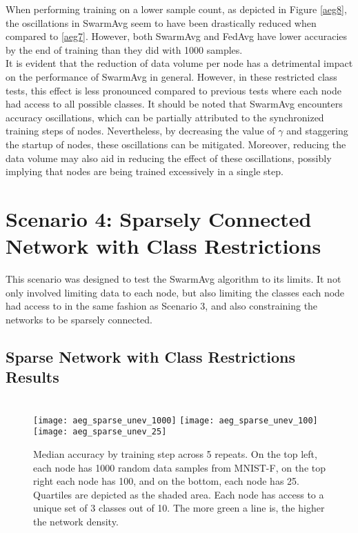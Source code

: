 When performing training on a lower sample count, as depicted in Figure \ref{aeg8}, the oscillations in SwarmAvg seem to have been drastically reduced when compared to \ref{aeg7}. However, both SwarmAvg and FedAvg have lower accuracies by the end of training than they did with 1000 samples. \\

It is evident that the reduction of data volume per node has a detrimental impact on the performance of SwarmAvg in general. However, in these restricted class tests, this effect is less pronounced compared to previous tests where each node had access to all possible classes. It should be noted that SwarmAvg encounters accuracy oscillations, which can be partially attributed to the synchronized training steps of nodes. Nevertheless, by decreasing the value of $\gamma$ and staggering the startup of nodes, these oscillations can be mitigated. Moreover, reducing the data volume may also aid in reducing the effect of these oscillations, possibly implying that nodes are being trained excessively in a single step.

\section{Scenario 4: Sparsely Connected Network with Class Restrictions}
This scenario was designed to test the SwarmAvg algorithm to its limits. It not only involved limiting data to each node, but also limiting the classes each node had access to in the same fashion as Scenario 3, and also constraining the networks to be sparsely connected.

\subsection{Sparse Network with Class Restrictions Results}

\begin{figure}[H] 
	 \\
	\texttt{[image: aeg\_sparse\_unev\_1000]}
	\texttt{[image: aeg\_sparse\_unev\_100]}
	\texttt{[image: aeg\_sparse\_unev\_25]}
	\caption{Median accuracy by training step across 5 repeats. On the top left, each node has 1000 random data samples from MNIST-F, on the top right each node has 100, and on the bottom, each node has 25. Quartiles are depicted as the shaded area. Each node has access to a unique set of 3 classes out of 10. The more green a line is, the higher the network density.}
	\label{aeg9}
\end{figure}

